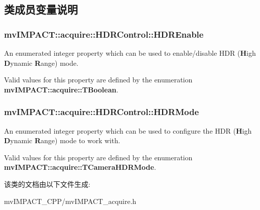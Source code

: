 \subsection{类成员变量说明}
\hypertarget{classmv_i_m_p_a_c_t_1_1acquire_1_1_h_d_r_control_ac1258a5d35abaeff1e586c262c237cf5}{
\subsubsection[{H\+D\+R\+Enable}]{ mv\+I\+M\+P\+A\+C\+T\+::acquire\+::\+H\+D\+R\+Control\+::\+H\+D\+R\+Enable}}\label{classmv_i_m_p_a_c_t_1_1acquire_1_1_h_d_r_control_ac1258a5d35abaeff1e586c262c237cf5}


An enumerated integer property which can be used to enable/disable H\+D\+R ({\bfseries H}igh {\bfseries D}ynamic {\bfseries R}ange) mode. 

Valid values for this property are defined by the enumeration {\bfseries mv\+I\+M\+P\+A\+C\+T\+::acquire\+::\+T\+Boolean}. \hypertarget{classmv_i_m_p_a_c_t_1_1acquire_1_1_h_d_r_control_af3ea6905ac186b59126fd22a2bdf3fa3}{
\subsubsection[{H\+D\+R\+Mode}]{ mv\+I\+M\+P\+A\+C\+T\+::acquire\+::\+H\+D\+R\+Control\+::\+H\+D\+R\+Mode}}\label{classmv_i_m_p_a_c_t_1_1acquire_1_1_h_d_r_control_af3ea6905ac186b59126fd22a2bdf3fa3}


An enumerated integer property which can be used to configure the H\+D\+R ({\bfseries H}igh {\bfseries D}ynamic {\bfseries R}ange) mode to work with. 

Valid values for this property are defined by the enumeration {\bfseries mv\+I\+M\+P\+A\+C\+T\+::acquire\+::\+T\+Camera\+H\+D\+R\+Mode}. 

该类的文档由以下文件生成\+:\begin{DoxyCompactItemize}
\item 
mv\+I\+M\+P\+A\+C\+T\+\_\+\+C\+P\+P/mv\+I\+M\+P\+A\+C\+T\+\_\+acquire.\+h\end{DoxyCompactItemize}
